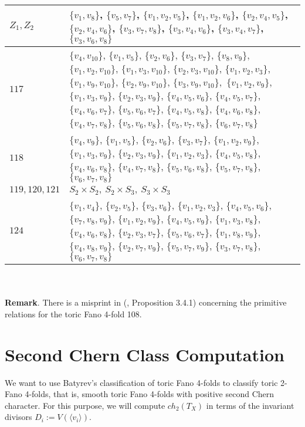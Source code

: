 \documentclass[10pt]{article}
\begin{document}
\begin{tabular}{|p{2cm}| p{}|}
$Z_1,Z_2$ & $\{v_1, v_8\}$, $\{v_5, v_7\}$, $\{v_1, v_2, v_5\}$, $\{v_1, v_2, v_6\}$, $\{v_2, v_4, v_5\}$, $\{v_2, v_4, v_6\}$, $\{v_3, v_7, v_8\}$, $\{v_3, v_4, v_6\}$, $\{v_3, v_4, v_7\}$, $\{v_3, v_6, v_8\}$   \\
\hline
$117$ & $\{v_4, v_{10}\}$, $\{v_1, v_5\}$, $\{v_2, v_6\}$, $\{v_3, v_7\}$, $\{v_8, v_9\},$ $\{v_1, v_2, v_{10}\}$, $\{v_1, v_3, v_{10}\}$, $\{v_2, v_3, v_{10}\}$, $\{v_1, v_2, v_3\}$, $\{v_1, v_9, v_{10}\}$, $\{v_2, v_9, v_{10}\}$, $\{v_3, v_9, v_{10}\},$  $\{v_1, v_2, v_9\}$, $\{v_1, v_3, v_9\}$, $\{v_2, v_3, v_9\}$, $\{v_4, v_5, v_6\}$, $\{v_4, v_5, v_7\}$, $\{v_4, v_6, v_7\}$, $\{v_5, v_6, v_7\}$, $\{v_4, v_5, v_8\}$, $\{v_4, v_6, v_8\}$, $\{v_4, v_7, v_8\}$, $\{v_5, v_6, v_8\}$, $\{v_5, v_7, v_8\}$,  $\{v_6, v_7, v_8\}$           \\
\hline
$118$ & $\{v_4, v_9\}$,  $\{v_1, v_5\}$, $\{v_2, v_6\}$, $\{v_3, v_7\}$,  $\{v_1,v_2,v_9\}$, $\{v_1, v_3, v_9\}$, $\{v_2, v_3, v_9\}$,  $\{v_1, v_2, v_3\}$, $\{v_4, v_5, v_8\}$, $\{v_4, v_6, v_8\}$, $\{v_4, v_7, v_8\}$, $\{v_5, v_6, v_8\}$, $\{v_5, v_7, v_8\}$, $\{v_6, v_7, v_8\}$   \\ \hline 

$119, 120, 121$ & $S_2\times S_2, \ S_2\times S_3, \ S_3\times S_3$ \\ \hline
$124$ & $\{v_1, v_4\}$,  $\{v_2, v_5\}$, $\{v_3, v_6\}$, $\{v_1, v_2, v_3\}$,  $\{v_4,v_5,v_6\}$, $\{v_7, v_8, v_9\}$,  $\{v_1, v_2, v_9\}$, $\{v_4, v_5, v_9\}$, $\{v_1, v_3, v_8\}$, $\{v_4, v_6, v_8\}$, $\{v_2, v_3, v_7\}$, $\{v_5, v_6, v_7\}$, $\{v_1, v_8, v_9\},$ $\{v_4, v_8, v_9\}$, $\{v_2, v_7, v_9\}$, $\{v_5, v_7, v_9\}$, $\{v_3, v_7, v_8\}$, $\{v_6, v_7, v_8\}$ \\ \hline

\end{tabular}\\ \\

\textbf{Remark}. There is a misprint in (\cite{bat}, Proposition 3.4.1) concerning the primitive relations for the toric Fano 4-fold 108.
      

\section{Second Chern Class Computation}

We want to use Batyrev's classification of toric Fano 4-folds to classify toric 2-Fano 4-folds, that is, smooth toric Fano 4-folds with positive second Chern character. For this purpose, we will compute $ch_2(T_X)$ in terms of the invariant divisors $D_i:=V(\langle v_i\rangle)$.\\
\end{document}
